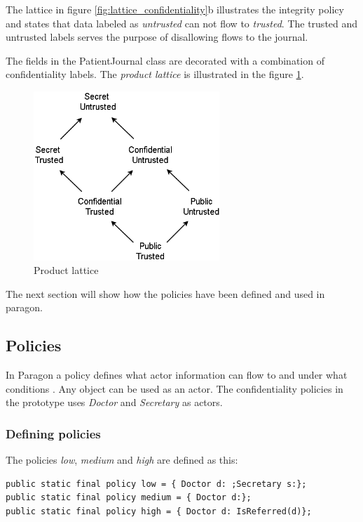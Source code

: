 The lattice in figure \ref{fig:lattice_confidentiality}b illustrates the integrity policy and states that data labeled as \emph{untrusted} can not flow to \emph{trusted}. The trusted and untrusted labels serves the purpose of disallowing flows to the journal.

The fields in the PatientJournal class are decorated with a combination of confidentiality labels. The \emph{product lattice} is illustrated in the figure \ref{fig:lattice_product}.

\begin{figure}[H] 
	\centering
	\includegraphics[width=7cm]{figures/lattice_product.png}
	\caption{Product lattice}
	\label{fig:lattice_product}
\end{figure}


The next section will show how the policies have been defined and used in paragon. 



\subsection{Policies}\label{policies} 

In Paragon a policy defines what actor information can flow to and under what conditions 
\cite{paragonprogramming}. Any object can be used as an actor. The confidentiality policies in the prototype uses \emph{Doctor} and \emph{Secretary} as actors. 


\subsubsection{Defining policies}
The policies \emph{low}, \emph{medium} and \emph{high} are defined as this:

\begin{lstlisting}
public static final policy low = { Doctor d: ;Secretary s:};
public static final policy medium = { Doctor d:};
public static final policy high = { Doctor d: IsReferred(d)};
\end{lstlisting}


